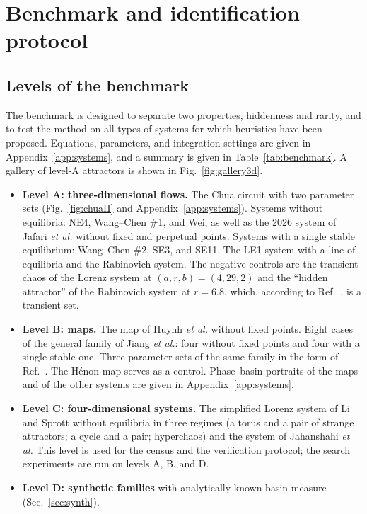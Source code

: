 \section{Benchmark and identification protocol}\label{sec:bench}

\subsection{Levels of the benchmark}\label{sec:levels}

The benchmark is designed to separate two properties, hiddenness and rarity, and to test the method on all types of systems for which heuristics have been proposed. Equations, parameters, and integration settings are given in Appendix~\ref{app:systems}, and a summary is given in Table~\ref{tab:benchmark}. A gallery of level-A attractors is shown in Fig.~\ref{fig:gallery3d}.
\begin{itemize}
\item \textbf{Level A: three-dimensional flows.} The Chua circuit with two parameter sets\cite{Leonov2011PLA,GuanXie2025,Kuznetsov2023Chua} (Fig.~\ref{fig:chuaII} and Appendix~\ref{app:systems}). Systems without equilibria: NE4, Wang--Chen \#1, and Wei,\cite{Wei2011,JafariSprottGolpayegani2013} as well as the 2026 system of Jafari \textit{et al.} without fixed and perpetual points.\cite{Jafari2026NoPP} Systems with a single stable equilibrium: Wang--Chen \#2, SE3, and SE11.\cite{WangChen2012,Molaie2013} The LE1 system with a line of equilibria\cite{JafariSprott2013} and the Rabinovich system.\cite{Kuznetsov2018Rabinovich} The negative controls are the transient chaos of the Lorenz system at $(a,r,b)=(4,29,2)$\cite{YorkeYorke1979} and the ``hidden attractor'' of the Rabinovich system at $r=6.8$, which, according to Ref.~, is a transient set.
\item \textbf{Level B: maps.} The map of Huynh \textit{et al.} without fixed points.\cite{Huynh2019} Eight cases of the general family of Jiang \textit{et al.}:\cite{Jiang2016Maps} four without fixed points and four with a single stable one. Three parameter sets of the same family in the form of Ref.~. The H\'enon map serves as a control. Phase--basin portraits of the maps and of the other systems are given in Appendix~\ref{app:systems}.
\item \textbf{Level C: four-dimensional systems.} The simplified Lorenz system of Li and Sprott without equilibria\cite{LiSprott2014} in three regimes (a torus and a pair of strange attractors; a cycle and a pair; hyperchaos) and the system of Jahanshahi \textit{et al.}\cite{Jahanshahi2019} This level is used for the census and the verification protocol; the search experiments are run on levels A, B, and D.
\item \textbf{Level D: synthetic families} with analytically known basin measure (Sec.~\ref{sec:synth}).
\end{itemize}

